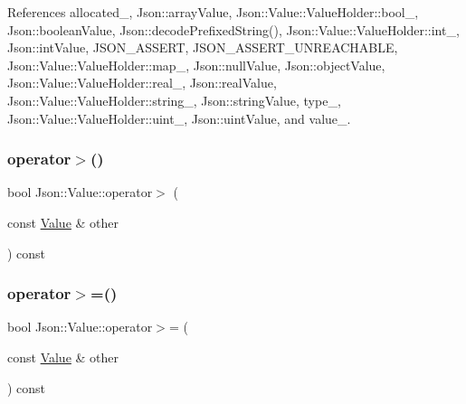 References allocated\+\_\+, Json\+::array\+Value, Json\+::\+Value\+::\+Value\+Holder\+::bool\+\_\+, Json\+::boolean\+Value, Json\+::decode\+Prefixed\+String(), Json\+::\+Value\+::\+Value\+Holder\+::int\+\_\+, Json\+::int\+Value, J\+S\+O\+N\+\_\+\+A\+S\+S\+E\+RT, J\+S\+O\+N\+\_\+\+A\+S\+S\+E\+R\+T\+\_\+\+U\+N\+R\+E\+A\+C\+H\+A\+B\+LE, Json\+::\+Value\+::\+Value\+Holder\+::map\+\_\+, Json\+::null\+Value, Json\+::object\+Value, Json\+::\+Value\+::\+Value\+Holder\+::real\+\_\+, Json\+::real\+Value, Json\+::\+Value\+::\+Value\+Holder\+::string\+\_\+, Json\+::string\+Value, type\+\_\+, Json\+::\+Value\+::\+Value\+Holder\+::uint\+\_\+, Json\+::uint\+Value, and value\+\_\+.

\mbox{\label{classJson_1_1Value_a4646c2f0764908c0972160c7c2ebe567_a4646c2f0764908c0972160c7c2ebe567}} 
\subsubsection{\texorpdfstring{operator$>$()}{operator>()}}
{\footnotesize\ttfamily bool Json\+::\+Value\+::operator$>$ (\begin{DoxyParamCaption}\item[{const \hyperlink{classJson_1_1Value}{Value} \&}]{other }\end{DoxyParamCaption}) const}

\mbox{\label{classJson_1_1Value_afe2c3e52df60b9622cbd8358b74bdbf5_afe2c3e52df60b9622cbd8358b74bdbf5}} 
\subsubsection{\texorpdfstring{operator$>$=()}{operator>=()}}
{\footnotesize\ttfamily bool Json\+::\+Value\+::operator$>$= (\begin{DoxyParamCaption}\item[{const \hyperlink{classJson_1_1Value}{Value} \&}]{other }\end{DoxyParamCaption}) const}

\mbox{\label{classJson_1_1Value_a7d99f5dba388cdaa152ce6ef933d64ef_a7d99f5dba388cdaa152ce6ef933d64ef}} 
